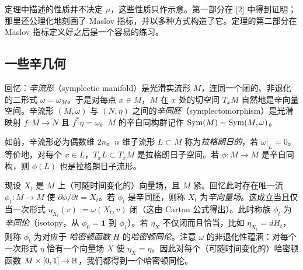 


定理中描述的性质并不决定 $\mu$，这些性质只作示意。第一部分在 [2] 中得到证明；那里还公理化地刻画了 Maslov 指标，并以多种方式构造了它。定理的第二部分在 Maslov 指标定义好之后是一个容易的练习。

\subsection{一些辛几何}
\label{subsec:sympl-geom}

回忆：\emph{辛流形}（symplectic manifold）是光滑实流形 $M$，连同一个闭的、非退化的二形式 $\omega=\omega_M$。于是对每点 $x\in M$，$M$ 在 $x$ 处的切空间 $T_xM$ 自然地是辛向量空间。辛流形 $(M,\omega)$ 与 $(N,\eta)$ 之间的\emph{辛同胚}（symplectomorphism）是光滑映射 $f: M\to N$ 且 $f^*\eta=\omega$。$M$ 的辛自同构群记作 $\operatorname{Sym}(M)=\operatorname{Sym}(M,\omega)$。

如前，辛流形必为偶数维 $2n$。$n$ 维子流形 $L\subset M$ 称为\emph{拉格朗日的}，若 $\omega|_L=0$。等价地，对每个 $x\in L$，$T_xL\subset T_xM$ 是拉格朗日子空间。若 $\phi: M\to M$ 是辛自同构，则 $\phi(L)$ 也是拉格朗日子流形。

现设 $X_t$ 是 $M$ 上（可随时间变化的）向量场，且 $M$ 紧。回忆此时存在唯一流 $\phi_t: M\to M$ 使 $\partial\phi/\partial t=X_t$。若 $\phi_t$ 是辛同胚，则称 $X_t$ 为\emph{辛向量场}。这成立当且仅当一次形式 $\eta_{X_t}(v):=\omega(X_t,v)$ 闭（这由 Cartan 公式得出）。此时称族 $\phi_t$ 为\emph{辛同伦}（isotopy，从 $\phi_0=\mathbf 1$ 到 $\phi_1$）。若 $\eta_X$ 不仅闭而且恰当，比如 $\eta_{X_t}=dH_t$，则称 $\phi_t$ 为对应于 \emph{哈密顿函数} $H$ 的\emph{哈密顿同伦}。注意 $\omega$ 的非退化性蕴涵：对每个一次形式 $\eta$ 恰有一个向量场 $X$ 使 $\eta_X=\eta$。因此对每个（可随时间变化的）哈密顿函数 $M\times[0,1]\to\mathbb{R}$，我们都得到一个哈密顿同伦。

